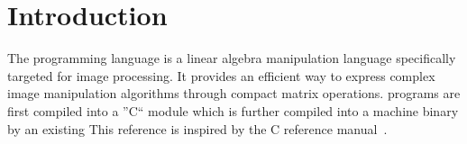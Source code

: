 \newcommand{\startsyn}{\begin{center}\begin{tabular}{l}}
\newcommand{\stopsyn}{\end{tabular}\end{center}}

\section{Introduction}
The \sys{} programming language is a linear algebra manipulation language
specifically targeted for image processing. It provides an efficient way to
express complex image manipulation algorithms through compact matrix
operations. \sys{} programs are first compiled into a ''C`` module which is
further compiled into a machine binary by an existing 
This reference is inspired by the C reference manual~\cite{DBLP:books/ph/KernighanR88}.








